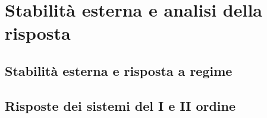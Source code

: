\documentclass[../main.tex]{subfiles}
\begin{document}
\clearpage
\thispagestyle{empty}
\vspace*{7cm}
\section{Stabilità esterna e analisi della risposta}
\vspace*{1.5cm}


\subsection{Stabilità esterna e risposta a regime}



\subsection{Risposte dei sistemi del I e II ordine}
\end{document}
